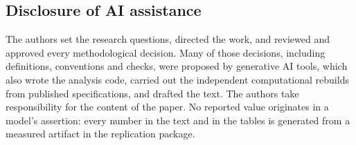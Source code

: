 \subsection{Disclosure of AI assistance}
\label{sec:aidisclosure}

The authors set the research questions, directed the work, and reviewed and approved every
methodological decision. Many of those decisions, including definitions, conventions and checks,
were proposed by generative AI tools, which also wrote the analysis code, carried out the
independent computational rebuilds from published specifications, and drafted the text. The
authors take responsibility for the content of the paper. No reported value originates in a
model's assertion: every number in the text and in the tables is generated from a measured
artifact in the replication package.
